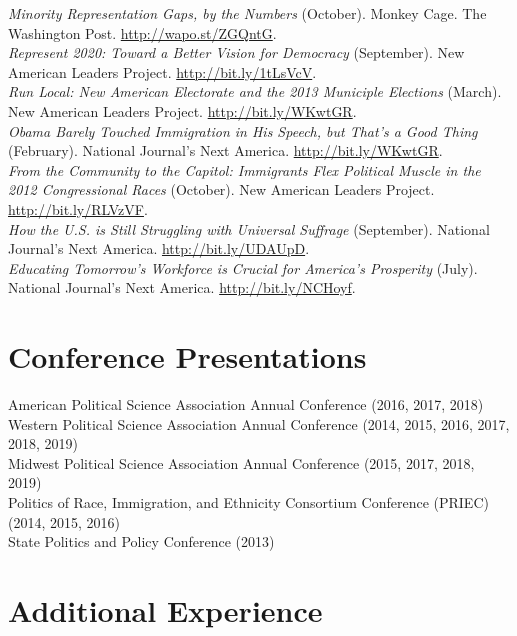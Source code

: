 \documentclass[11pt, a4paper]{article}
\newcommand{\years}[1]{\marginnote{\scriptsize #1}}
\begin{document}
\years{2014}\textit{Minority Representation Gaps, by the Numbers} (October). Monkey Cage. The Washington Post. \href{http://wapo.st/ZGQntG}{http://wapo.st/ZGQntG}.\\
\years{}\textit{Represent 2020: Toward a Better Vision for Democracy} (September). New American Leaders Project. \href{http://bit.ly/1tLsVcV}{http://bit.ly/1tLsVcV}.\\
\years{2013}\textit{Run Local: New American Electorate and the 2013 Municiple Elections} (March). New American Leaders Project. \href{http://bit.ly/WKwtGR}{http://bit.ly/WKwtGR}.\\
\years{}\textit{Obama Barely Touched Immigration in His Speech, but That's a Good Thing} (February). National Journal's Next America. \href{http://bit.ly/12R7lVG}{http://bit.ly/WKwtGR}.\\
\years{2012}\textit{From the Community to the Capitol: Immigrants Flex Political Muscle in the 2012 Congressional Races} (October). New American Leaders Project. \href{http://bit.ly/RLVzVF}{http://bit.ly/RLVzVF}.\\
\years{}\textit{How the U.S. is Still Struggling with Universal Suffrage} (September). National Journal's Next America.  \href{http://bit.ly/UDAUpD}{http://bit.ly/UDAUpD}.\\
\years{}\textit{Educating Tomorrow's Workforce is Crucial for America's Prosperity} (July). National Journal's Next America. \href{http://bit.ly/NCHoyf}{http://bit.ly/NCHoyf}.\\

\section*{Conference Presentations}

\years{}American Political Science Association Annual Conference (2016, 2017, 2018)\\
\years{}Western Political Science Association Annual Conference (2014, 2015, 2016, 2017, 2018, 2019)\\
\years{}Midwest Political Science Association Annual Conference (2015, 2017, 2018, 2019)\\
\years{}Politics of Race, Immigration, and Ethnicity Consortium Conference (PRIEC) (2014, 2015, 2016)\\
\years{}State Politics and Policy Conference (2013)

\section*{Additional Experience}
\end{document}
